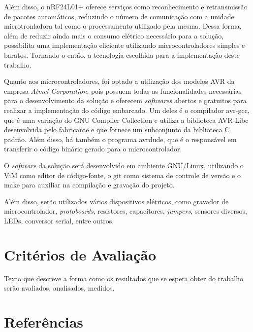 \documentclass[
    12pt,               %
    a4paper,            %
    english,            %
    brazil,             %
    ]{article}
\begin{document}
Além disso, o nRF24L01+ oferece serviços como reconhecimento e retransmissão de pacotes automáticos, reduzindo o número de
comunicação com a unidade microtronladora tal como o processamento utilizado pela mesma. Dessa forma, além de reduzir ainda mais o
consumo elétrico necessário para a solução, possibilita uma implementação eficiente utilizando microcontroladores simples e
baratos. Tornando-o então, a tecnologia escolhida para a implementação deste trabalho.

Quanto aos microcontroladores, foi optado a utilização dos modelos AVR da empresa \textit{Atmel Corporation}, pois possuem todas
as funcionalidades necessárias para o desenvolvimento da solução e oferecem \textit{softwares} abertos e gratuitos para realizar a
implementação do código embarcado. Um deles é o compilador avr-gcc, que é uma variação do GNU Compiler Collection e utiliza
a biblioteca AVR-Libc desenvolvida pelo fabricante e que fornece um subconjunto da biblioteca C padrão. Além disso, há também o
programa avrdude, que é o responsável em transferir o código binário gerado para o microcontrolador.

O \textit{software} da solução será desenvolvido em ambiente GNU/Linux, utilizando o ViM como editor de código-fonte, o git como sistema
de controle de versão e o make para auxiliar na compilação e gravação do projeto.

Além disso, serão utilizados vários dispositivos elétricos, como gravador de microcontrolador, \textit{protoboards}, resistores,
capacitores, \textit{jumpers}, sensores diversos, LEDs, conversor serial, entre outros.

\section{Critérios de Avaliação}

Texto que descreve a forma como os resultados que se espera obter do trabalho serão avaliados, analisados, medidos.


\section{Referências}
\end{document}
